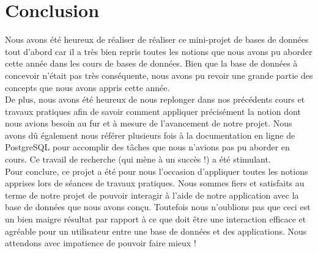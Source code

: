 \section{Conclusion}
Nous avons été heureux de réaliser de réaliser ce mini-projet de bases de données tout d'abord car il a très bien repris toutes les notions que nous avons pu aborder cette année dans les cours de bases de données. Bien que la base de données à concevoir n'était pas très conséquente, nous avons pu revoir une grande partie des concepts que nous avons appris cette année.\\

De plus, nous avons été heureux de nous replonger dans nos précédents cours et travaux pratiques afin de savoir comment appliquer précisément la notion dont nous avions besoin au fur et à mesure de l'avancement de notre projet. Nous avons dû également nous référer plusieurs fois à la documentation en ligne de PostgreSQL pour accomplir des tâches que nous n'avions pas pu aborder en cours. Ce travail de recherche (qui mène à un succès !) a été stimulant.\\

Pour conclure, ce projet a été pour nous l'occasion d'appliquer toutes les notions apprises lors de séances de travaux pratiques. Nous sommes fiers et satisfaits au terme de notre projet de pouvoir interagir à l'aide de notre application avec la base de données que nous avons conçu. Toutefois nous n'oublions pas que ceci est un bien maigre résultat par rapport à ce que doit être une interaction efficace et agréable pour un utilisateur entre une base de données et des applications. Nous attendons avec impatience de pouvoir faire mieux !